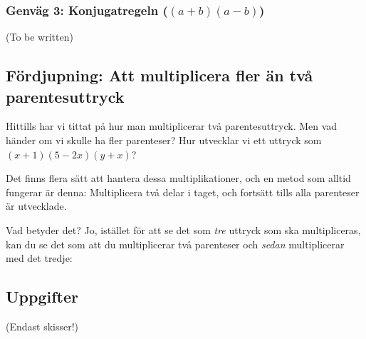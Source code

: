 \subsubsection{Genväg 3: Konjugatregeln ($(a+b)(a-b)$)}

(To be written)

\subsection{Fördjupning: Att multiplicera fler än två parentesuttryck}

Hittills har vi tittat på hur man multiplicerar två parentesuttryck.
Men vad händer om vi skulle ha fler parenteser?
Hur utvecklar vi ett uttryck som $(x+1)(5-2x)(y+x)$?

Det finns flera sätt att hantera dessa multiplikationer, och en metod som alltid fungerar är denna:
Multiplicera två delar i taget, och fortsätt tills alla parenteser är utvecklade.

Vad betyder det?
Jo, istället för att se det som \emph{tre} uttryck som ska multipliceras, kan du se det som att du multiplicerar två parenteser och \emph{sedan} multiplicerar med det tredje:

\smallskip
{}
\smallskip

\subsection{Uppgifter}

(Endast skisser!)

